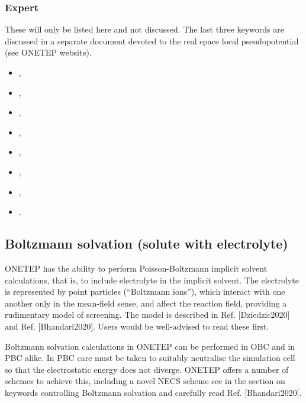 \documentclass[letterpaper,10pt,english]{sphinxmanual}
\begin{document}
\subsubsection{Expert}
\label{\detokenize{implicit_solvation_v3:expert}}
These will only be listed here and not discussed. The last three
keywords are discussed in a separate document devoted to the real space
local pseudopotential (see ONETEP website).
\begin{itemize}
\item {} 
,

\item {} 
,

\item {} 
,

\item {} 
,

\item {} 
,

\item {} 
,

\item {} 
,

\item {} 
.

\end{itemize}


\subsection{Boltzmann solvation (solute with electrolyte)}
\label{\detokenize{implicit_solvation_v3:boltzmann-solvation-solute-with-electrolyte}}
ONETEP has the ability to perform Poisson-Boltzmann implicit solvent
calculations, that is, to include electrolyte in the implicit solvent.
The electrolyte is represented by point particles (“Boltzmann ions”),
which interact with one another only in the mean-field sense, and affect
the reaction field, providing a rudimentary model of screening. The
model is described in Ref. {[}Dziedzic2020{]} and Ref. {[}Bhandari2020{]}. Users would be well-advised to
read these first.

Boltzmann solvation calculations in ONETEP can be performed in OBC and
in PBC alike. In PBC care must be taken to suitably neutralise the
simulation cell so that the electrostatic energy does not diverge.
ONETEP offers a number of schemes to achieve this, including a novel
NECS scheme \textendash{} see  in
the section on keywords controlling Boltzmann solvation and carefully read Ref. {[}Bhandari2020{]}.
\end{document}
